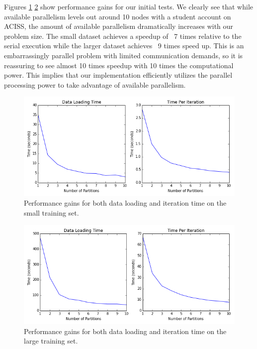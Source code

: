 Figures \ref{fig:small} \ref{fig:big} show performance gains for our initial tests.  We clearly see that while available parallelism levels out around 10 nodes with a student account on ACISS, the amount of available parallelism dramatically increases with our problem size.  The small dataset achieves a speedup of ~7 times relative to the serial execution while the larger dataset achieves ~9 times speed up.  This is an embarrassingly parallel problem with limited communication demands, so it is reassuring to see almost 10 times speedup with 10 times the computational power.  This implies that our implementation efficiently utilizes the parallel processing power to take advantage of available parallelism.

\begin{figure}[h]
\begin{center}
\includegraphics[scale=0.7]{small_metrics.png}
\caption{Performance gains for both data loading and iteration time on the small training set.}
\label{fig:small}
\end{center}
\end{figure}

\begin{figure}[h]
\begin{center}
\includegraphics[scale=0.7]{big_metrics.png}
\caption{Performance gains for both data loading and iteration time on the large training set.}
\label{fig:big}
\end{center}
\end{figure}

